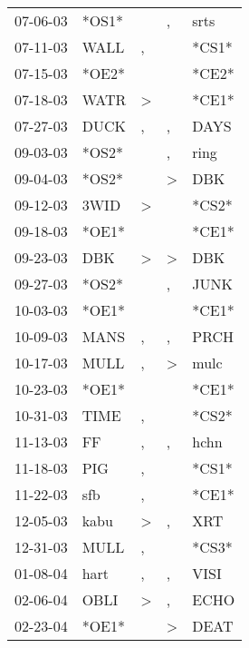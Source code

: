 \begin{supertabular}{lllll}
 07-06-03 &  *OS1* &                  &                , &   srts \\
 07-11-03 &   WALL &                , &                  &  *CS1* \\
 07-15-03 &  *OE2* &                  &                  &  *CE2* \\
 07-18-03 &   WATR &     \textgreater &                  &  *CE1* \\
 07-27-03 &   DUCK &                , &                , &   DAYS \\
 09-03-03 &  *OS2* &                  &                , &   ring \\
 09-04-03 &  *OS2* &                  &     \textgreater &    DBK \\
 09-12-03 &   3WID &     \textgreater &                  &  *CS2* \\
 09-18-03 &  *OE1* &                  &                  &  *CE1* \\
 09-23-03 &    DBK &     \textgreater &     \textgreater &    DBK \\
 09-27-03 &  *OS2* &                  &                , &   JUNK \\
 10-03-03 &  *OE1* &                  &                  &  *CE1* \\
 10-09-03 &   MANS &                , &                , &   PRCH \\
 10-17-03 &   MULL &                , &     \textgreater &   mulc \\
 10-23-03 &  *OE1* &                  &                  &  *CE1* \\
 10-31-03 &   TIME &                , &                  &  *CS2* \\
 11-13-03 &     FF &                , &                , &   hchn \\
 11-18-03 &    PIG &                , &                  &  *CS1* \\
 11-22-03 &    sfb &                , &                  &  *CE1* \\
 12-05-03 &   kabu &     \textgreater &                , &    XRT \\
 12-31-03 &   MULL &                , &                  &  *CS3* \\
 01-08-04 &   hart &                , &                , &   VISI \\
 02-06-04 &   OBLI &     \textgreater &                , &   ECHO \\
 02-23-04 &  *OE1* &                  &     \textgreater &   DEAT \\

\end{supertabular}
